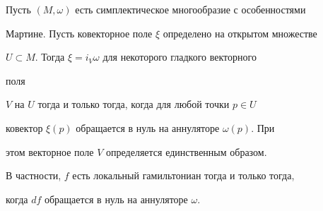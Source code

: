 \begin{lemnonum} \label{lm1}


Пусть $(M,\omega)$ есть симплектическое многообразие с особенностями


Мартине. Пусть ковекторное поле $\xi$ определено на открытом множестве


$U \subset M$. Тогда $\xi = i_V \omega$ для некоторого гладкого векторного


поля


$V$ на $U$ тогда и только тогда, когда для любой точки $p \in U$


ковектор $\xi(p)$ обращается в нуль на аннуляторе $\omega(p)$. При


этом векторное поле $V$ определяется единственным образом.





В частности, $f$ есть локальный гамильтониан тогда и только тогда,


когда $df$ обращается в нуль на аннуляторе $\omega$.


\end{lemnonum}








